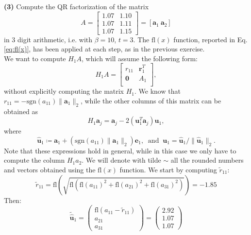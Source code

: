 \documentclass[a4paper,11pt]{article}
\begin{document}
\noindent \textbf{(3)} Compute the QR factorization of the matrix
\begin{equation}\label{key}
	A = \begin{bmatrix}
		1.07 & 1.10  \\
		1.07 & 1.11  \\
		1.07 & 1.15 
	\end{bmatrix} = [\textbf{a}_1\ \textbf{a}_2]
\end{equation}
in 3 digit arithmetic, i.e. with $\beta = 10$, $t=3$. The $\text{fl}(x)$ function, reported in Eq. \eqref{eq:fl(x)}, has been applied at each step, as in the previous exercise.\\
We want to compute $H_1 A$, which will assume the following form:
\begin{equation}\label{key}
	H_1 A = \begin{bmatrix}
			r_{11} & \textbf{r}_1^T  \\
			\textbf{0} & A_1  \\
			\end{bmatrix},
\end{equation}
without explicitly computing the matrix $H_{1}$. We know that $r_{11} = -\text{sgn}(a_{11})\lVert \textbf{a}_1\rVert_2 $, while the other columns of this matrix can be obtained as
\[H_1 \textbf{a}_j = \textbf{a}_j - 2 (\textbf{u}_1^T\textbf{a}_j) \textbf{u}_1,\]
where
\[\hat{\textbf{u}}_{1} \coloneqq \textbf{a}_{1} + (\text{sgn}(a_{11})\lVert \textbf{a}_1\rVert_2)\textbf{e}_{1},\ \text{ and }\ \textbf{u}_{1} = \hat{\textbf{u}}_{1}/\lVert \hat{\textbf{u}}_1\rVert_2.\]
Note that these expressions hold in general, while in this case we only have to compute the column $H_{1}a_{2}$. We will denote with tilde $\sim$ all the rounded numbers and vectors obtained using the $\text{fl}(x)$ function. We start by computing $\tilde{r}_{11}$:
\begin{equation}\label{eq:r_11_tilde}
	\tilde{r}_{11} = \text{fl}\left(\sqrt{\text{fl} \left( \text{fl}(a_{11})^{2} + \text{fl}(a_{21})^{2} + \text{fl}(a_{31})^{2} \right) }\right) = -1.85
\end{equation}
%
%
Then:
\begin{equation}
	\tilde{\hat{\textbf{u}}}_1 = 
	\begin{pmatrix}
		\text{fl}(a_{11} - \tilde{r}_{11}) \\
		a_{21}\\
		a_{31}
	\end{pmatrix}
	= \begin{pmatrix}
		2.92\\
		1.07\\
		1.07
	\end{pmatrix}
\end{equation}
\end{document}

